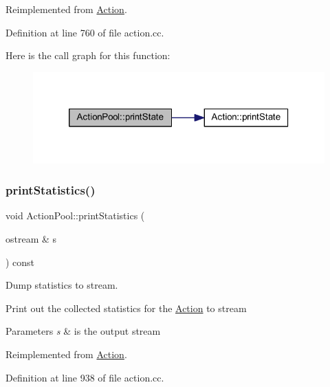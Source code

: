 Reimplemented from \mbox{\hyperlink{class_action_a8c64348dc5e9ad6ba914cf74aaac8bfb}{Action}}.



Definition at line 760 of file action.\+cc.

Here is the call graph for this function\+:
\nopagebreak
\begin{figure}[H]
\begin{center}
\leavevmode
\includegraphics[width=320pt]{class_action_pool_ac3301606be4afd36584109196c71e2ed_cgraph}
\end{center}
\end{figure}
\mbox{\label{class_action_pool_aed2073462c2dc9a3c33a6720f9cfc93b}} 
\subsubsection{\texorpdfstring{printStatistics()}{printStatistics()}}
{\footnotesize\ttfamily void Action\+Pool\+::print\+Statistics (\begin{DoxyParamCaption}\item[{ostream \&}]{s }\end{DoxyParamCaption}) const\hspace{0.3cm}{\ttfamily [virtual]}}



Dump statistics to stream. 

Print out the collected statistics for the \mbox{\hyperlink{class_action}{Action}} to stream 
\begin{DoxyParams}{Parameters}
{\em s} & is the output stream \\
\hline
\end{DoxyParams}


Reimplemented from \mbox{\hyperlink{class_action_a57e38931fcb3bf9dffac2946d5e790be}{Action}}.



Definition at line 938 of file action.\+cc.

